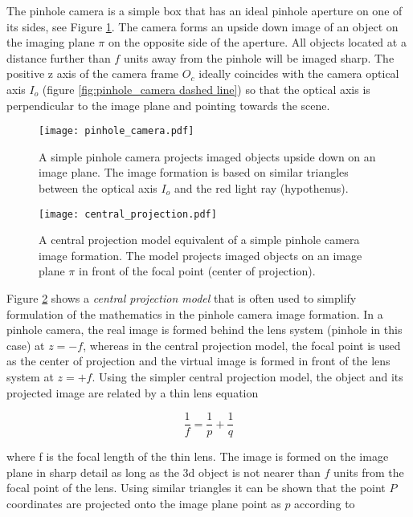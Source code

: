 \documentclass[12pt,a4paper,oneside,pdftex]{report}
\begin{document}
{The pinhole camera is a simple box that has an ideal pinhole aperture on one of its sides, see Figure \ref{fig:pinhole_camera}. The camera forms an upside down image of an object on the imaging plane $\pi$ on the opposite side of the aperture. All objects located at a distance further than $f$ units away from the pinhole will be imaged sharp. The positive z axis of the camera frame $O_c$ ideally coincides with the camera optical axis $I_o$ (figure \ref{fig:pinhole_camera dashed line}) so that the optical axis is perpendicular to the image plane and pointing towards the scene. 

\begin{figure}[ht]
  \begin{center}
    \texttt{[image: pinhole\_camera.pdf]}
    \caption{A simple pinhole camera projects imaged objects upside down on an image plane. The image formation is based on similar triangles between the optical axis $I_o$ and the red light ray (hypothenus).}
    \label{fig:pinhole_camera}
  \end{center}
\end{figure}

\begin{figure}[ht]
  \begin{center}
    \texttt{[image: central\_projection.pdf]}
    \caption{A central projection model equivalent of a simple pinhole camera image formation. The model projects imaged objects on an image plane $\pi$ in front of the focal point (center of projection).}
    \label{fig:central_projection}
  \end{center}
\end{figure}

Figure \ref{fig:central_projection} shows a \emph{central projection model} that is often used to simplify formulation of the mathematics in the pinhole camera image formation. In a pinhole camera, the real image is formed behind the lens system (pinhole in this case) at $z = -f$, whereas in the central projection model, the focal point is used as the center of projection and the virtual image is formed in front of the lens system at $z = +f$. Using the simpler central projection model, the object and its projected image are related by a thin lens equation

\begin{equation}
\frac{1}{f} = \frac{1}{p} + \frac{1}{q}
\label{eq:lens_law}
\end{equation}

where f is the focal length of the thin lens. The image is formed on the image plane in sharp detail as long as the 3d object is not nearer than $f$ units from the focal point of the lens. Using similar triangles it can be shown that the point $P$ coordinates are projected onto the image plane point as $p$ according to

}
\end{document}
